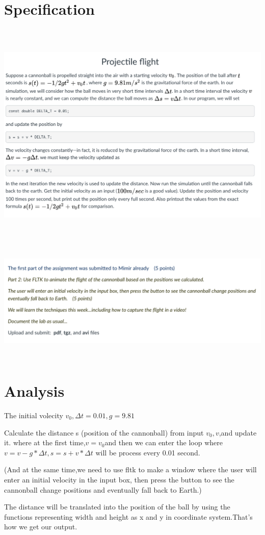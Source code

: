 \documentclass{article}
\begin{document}
\large
\section*{Specification}
\includegraphics[width = 19cm, height = 11cm]{part1.png}
\newpage
\includegraphics[width = 19cm, height = 6cm]{part2.png}
\newpage\section*{Analysis}
\begin{description}
	\item [Inputs]  The initial volecity $v_{0},\Delta t = 0.01, g = 9.81$
	\item [Process]  Calculate the distance s (position of the cannonball) from input $v_{0},v$,and update it.
	where at the first time,$v=v_{0}$and then we can enter the loop where $ v=v-g*\Delta t , s=s+v*\Delta t$ will be process every 0.01 second.
	\item (And at the same time,we need to use fltk to make a window where the user will enter an initial velocity in the input box, then press the button to see the cannonball change positions and eventually fall back to Earth.)
    \item [Outputs]  The distance will be translated into the position of the ball by using the functions representing width and height as  x and y in coordinate system.That's how we get our output.
\end{description}
\end{document}
